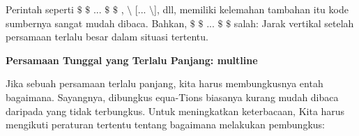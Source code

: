  Perintah seperti  $  \$  $ $  \$  $ ...  $  \$  $ $  \$  $ , $  \setminus  $ [...  $  \setminus  $], dll, memiliki kelemahan tambahan itu kode sumbernya sangat mudah dibaca. Bahkan,  $  \$  $ $  \$  $ ...  $  \$  $ $  \$  $ salah: Jarak vertikal setelah persamaan terlalu besar dalam situasi tertentu. \par
\vspace{12pt}
\noindent 
\textbf{Persamaan Tunggal yang Terlalu Panjang: multline} \par
\vspace{12pt}
\noindent 
 \hspace*{0.5in} Jika sebuah persamaan terlalu panjang, kita harus membungkusnya entah bagaimana. Sayangnya, dibungkus equa-Tions biasanya kurang mudah dibaca daripada yang tidak terbungkus. Untuk meningkatkan keterbacaan, Kita harus mengikuti peraturan tertentu tentang bagaimana melakukan pembungkus: \par
\noindent 

